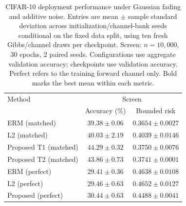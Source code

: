 \begin{table}[!htbp]
\centering\footnotesize
\setlength{\tabcolsep}{3pt}
\caption{CIFAR-10 deployment performance under Gaussian fading and additive noise. Entries are mean $\pm$ sample standard deviation across initialization/channel-bank seeds conditional on the fixed data split, using ten fresh Gibbs/channel draws per checkpoint. Screen: $n=10,000$, 30 epochs, 2 paired seeds. Configurations use aggregate validation accuracy; checkpoints use validation accuracy. Perfect refers to the training forward channel only. Bold marks the best mean within each metric.}
\label{tab:app_cifar_screen}
\begin{tabular}{lcc}
\toprule
Method & \multicolumn{2}{c}{Screen}\\
 & Accuracy (\%) & Bounded risk\\\midrule
ERM (matched) & $39.38\pm0.06$ & $\mathbf{0.3654\pm0.0027}$\\
L2 (matched) & $40.03\pm2.19$ & $0.4039\pm0.0146$\\
Proposed T1 (matched) & $\mathbf{44.29\pm0.32}$ & $0.3750\pm0.0076$\\
Proposed T2 (matched) & $43.86\pm0.73$ & $0.3741\pm0.0001$\\
ERM (perfect) & $29.41\pm0.36$ & $0.4638\pm0.0108$\\
L2 (perfect) & $29.46\pm0.63$ & $0.4652\pm0.0127$\\
Proposed (perfect) & $30.44\pm0.63$ & $0.4488\pm0.0041$\\
\bottomrule
\end{tabular}
\end{table}
